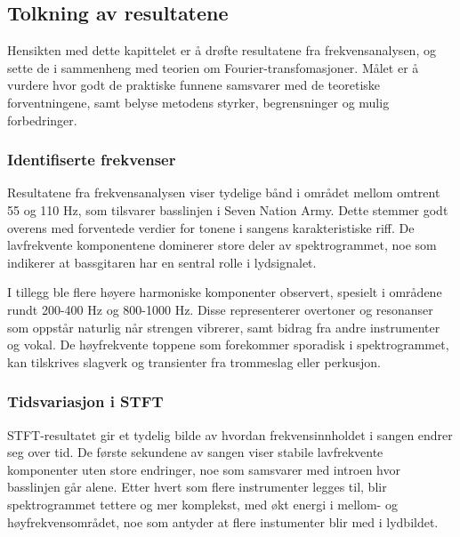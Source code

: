 

\subsection{Tolkning av resultatene}
Hensikten med dette kapittelet er å drøfte resultatene fra frekvensanalysen, og sette de i sammenheng med teorien om
Fourier-transfomasjoner. Målet er å vurdere hvor godt de praktiske funnene samsvarer med de teoretiske forventningene, samt
belyse metodens styrker, begrensninger og mulig forbedringer.

\subsubsection{Identifiserte frekvenser}
Resultatene fra frekvensanalysen viser tydelige bånd i området mellom omtrent 55 og 110 Hz, som tilsvarer basslinjen i Seven
Nation Army. Dette stemmer godt overens med forventede verdier for tonene i sangens karakteristiske riff. De lavfrekvente
komponentene dominerer store deler av spektrogrammet, noe som indikerer at bassgitaren har en sentral rolle i lydsignalet.

I tillegg ble flere høyere harmoniske komponenter observert, spesielt i områdene rundt 200-400 Hz og 800-1000 Hz. Disse
representerer overtoner og resonanser som oppstår naturlig når strengen vibrerer, samt bidrag fra andre instrumenter og vokal.
De høyfrekvente toppene som forekommer sporadisk i spektrogrammet, kan tilskrives slagverk og transienter fra trommeslag eller
perkusjon.

\subsubsection{Tidsvariasjon i STFT}
STFT-resultatet gir et tydelig bilde av hvordan frekvensinnholdet i sangen endrer seg over tid. De første sekundene av sangen 
viser stabile lavfrekvente komponenter uten store endringer, noe som samsvarer med introen hvor basslinjen går alene. Etter 
hvert som flere instrumenter legges til, blir spektrogrammet tettere og mer komplekst, med økt energi i mellom- og 
høyfrekvensområdet, noe som antyder at flere instumenter blir med i lydbildet.


